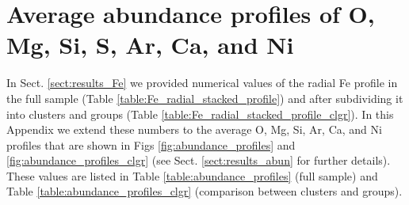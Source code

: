 \documentclass{aa}
\begin{document}
\section{Average abundance profiles of O, Mg, Si, S, Ar, Ca, and Ni}

In Sect. \ref{sect:results_Fe} we provided numerical values of the radial Fe profile in the full sample (Table \ref{table:Fe_radial_stacked_profile}) and after subdividing it into clusters and groups (Table \ref{table:Fe_radial_stacked_profile_clgr}). In this Appendix we extend these numbers to the average O, Mg, Si, Ar, Ca, and Ni profiles that are shown in Figs \ref{fig:abundance_profiles} and \ref{fig:abundance_profiles_clgr} (see Sect. \ref{sect:results_abun} for further details). These values are listed in Table \ref{table:abundance_profiles} (full sample) and Table \ref{table:abundance_profiles_clgr} (comparison between clusters and groups).
\end{document}
